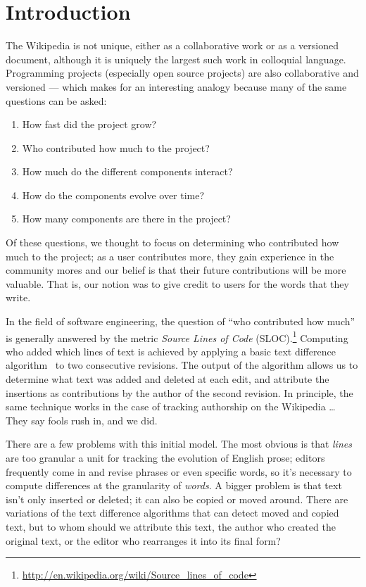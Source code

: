 
\section{Introduction}
\label{sec:diff-intro}

The Wikipedia is not unique, either as a collaborative work or as
a versioned document, although it is uniquely the largest such work
in colloquial language.
Programming projects (especially open source projects)
are also collaborative and versioned --- which makes for
an interesting analogy because many of the same questions can be asked:
\begin{enumerate}
\item How fast did the project grow?
\item Who contributed how much to the project?
\item How much do the different components interact?
\item How do the components evolve over time?
\item How many components are there in the project?
\end{enumerate}
Of these questions, we thought to focus on determining who contributed
how much to the project; as a user contributes more, they gain experience
in the community mores and our belief is that their future
contributions will be more valuable.
That is, our notion was to give credit to users for the words that
they write.

In the field of software engineering, the question of ``who contributed
how much'' is generally answered by the metric
\textit{Source Lines of Code} (SLOC).\footnote{\url{http://en.wikipedia.org/wiki/Source_lines_of_code}}
Computing who added which lines of text is achieved
by applying a basic text difference
algorithm~\cite{Myers86,TichyEditDist,BurnsLong97} to two consecutive
revisions.
The output of the algorithm allows us to determine what text was added and
deleted at each edit, and attribute the insertions as contributions by the
author of the second revision.
In principle, the same technique works in the case of tracking authorship
on the Wikipedia
\ldots\quad
They say fools rush in, and we did.

There are a few problems with this initial model.
The most obvious is that \textit{lines} are too granular
a unit for tracking the evolution of English prose;
editors frequently come in and revise phrases or
even specific words, so it's necessary to compute
differences at the granularity of \textit{words}.
A bigger problem is that text isn't only inserted
or deleted; it can also be copied or moved around.
There are variations of the text difference algorithms that can
detect moved and copied text, but to whom should we attribute this text,
the author who created the original text, or the editor who rearranges it
into its final form?

